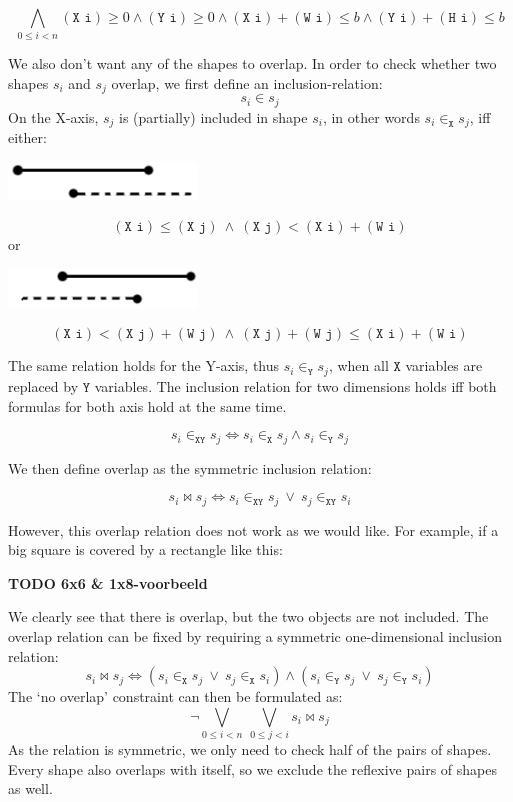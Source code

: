 \documentclass[12pt]{article}
\begin{document}
\[ \bigwedge_{0 \le i < n}
(\texttt{X i}) \ge 0 \wedge
(\texttt{Y i}) \ge 0 \wedge
(\texttt{X i})+(\texttt{W i}) \le b \wedge
(\texttt{Y i})+(\texttt{H i}) \le b
\]

We also don't want any of the shapes to overlap.
In order to check whether two shapes $s_i$ and $s_j$ overlap, we first define an inclusion-relation:
\[ s_i \in s_j \]
On the X-axis, $s_j$ is (partially) included in shape $s_i$, in other words $s_i \in_{\texttt{X}} s_j$, iff either:

\begin{center}
    \includegraphics[width=5cm]{bounds1.png}
\end{center}
\[ (\texttt{X i}) \le (\texttt{X j}) ~\wedge~ (\texttt{X j}) < (\texttt{X i}) + (\texttt{W i}) \]
or
\begin{center}
    \includegraphics[width=5cm]{bounds2.png}
\end{center}
\[ (\texttt{X i}) < (\texttt{X j}) + (\texttt{W j}) ~\wedge~ (\texttt{X j}) + (\texttt{W j}) \le (\texttt{X i}) + (\texttt{W i}) \]

The same relation holds for the Y-axis, thus $s_i \in_{\texttt{Y}} s_j$, when all $\texttt{X}$ variables are replaced by $\texttt{Y}$ variables.
The inclusion relation for two dimensions holds iff both formulas for both axis hold at the same time.

\[ s_i \in_{\texttt{XY}} s_j \iff s_i \in_{\texttt{X}} s_j \wedge s_i \in_{\texttt{Y}} s_j \]

We then define overlap as the symmetric inclusion relation:

\[ s_i \bowtie s_j \iff s_i \in_{\texttt{XY}} s_j ~\vee~ s_j \in_{\texttt{XY}} s_i \]

However, this overlap relation does not work as we would like.
For example, if a big square is covered by a rectangle like this:

\textbf{TODO 6x6 \& 1x8-voorbeeld}

We clearly see that there is overlap, but the two objects are not included.
The overlap relation can be fixed by requiring a symmetric one-dimensional inclusion relation:
\[ s_i \bowtie s_j \iff (s_i \in_{\texttt{X}} s_j ~\vee~ s_j \in_{\texttt{X}} s_i) \wedge (s_i \in_{\texttt{Y}} s_j ~\vee~ s_j \in_{\texttt{Y}} s_i) \]
The `no overlap' constraint can then be formulated as:
\[ \neg \bigvee_{0 \le i < n} ~ \bigvee_{0 \le j < i} s_i \bowtie s_j \]
As the relation is symmetric, we only need to check half of the pairs of shapes.
Every shape also overlaps with itself, so we exclude the reflexive pairs of shapes as well.
\end{document}

